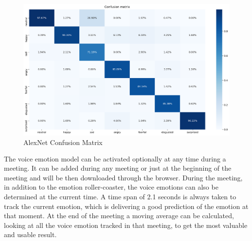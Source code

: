 \begin{figure}
\centering
\includegraphics[width=1\textwidth]{assets/alexnet_confusion_matrix.png}
\caption{AlexNet Confusion Matrix}
\label{fig:alexnet_confusion_matrix}
\end{figure}

The voice emotion model can be activated optionally at any time during a meeting. It can be added during any meeting or just at the beginning of the meeting and will be then downloaded through the browser. During the meeting, in addition to the emotion roller-coaster, the voice emotions can also be determined at the current time. A time span of 2.1 seconds is always taken to track the current emotion, which is delivering a good prediction of the emotion at that moment. At the end of the meeting a moving average can be calculated, looking at all the voice emotion tracked in that meeting, to get the most valuable and usable result.  
